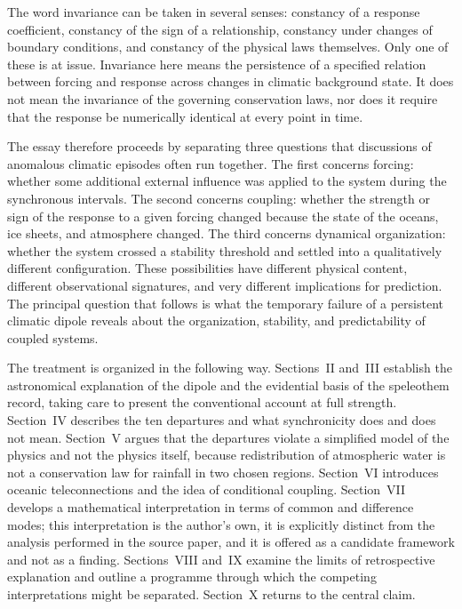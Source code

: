 \documentclass[11pt]{article}
\theoremstyle{definition}
\begin{document}
The word invariance can be taken in several senses: constancy of a response coefficient, constancy of the sign of a relationship, constancy under changes of boundary conditions, and constancy of the physical laws themselves. Only one of these is at issue. Invariance here means the persistence of a specified relation between forcing and response across changes in climatic background state. It does not mean the invariance of the governing conservation laws, nor does it require that the response be numerically identical at every point in time.

The essay therefore proceeds by separating three questions that discussions of anomalous climatic episodes often run together. The first concerns forcing: whether some additional external influence was applied to the system during the synchronous intervals. The second concerns coupling: whether the strength or sign of the response to a given forcing changed because the state of the oceans, ice sheets, and atmosphere changed. The third concerns dynamical organization: whether the system crossed a stability threshold and settled into a qualitatively different configuration. These possibilities have different physical content, different observational signatures, and very different implications for prediction. The principal question that follows is what the temporary failure of a persistent climatic dipole reveals about the organization, stability, and predictability of coupled systems.

The treatment is organized in the following way. Sections~II and~III establish the astronomical explanation of the dipole and the evidential basis of the speleothem record, taking care to present the conventional account at full strength. Section~IV describes the ten departures and what synchronicity does and does not mean. Section~V argues that the departures violate a simplified model of the physics and not the physics itself, because redistribution of atmospheric water is not a conservation law for rainfall in two chosen regions. Section~VI introduces oceanic teleconnections and the idea of conditional coupling. Section~VII develops a mathematical interpretation in terms of common and difference modes; this interpretation is the author's own, it is explicitly distinct from the analysis performed in the source paper, and it is offered as a candidate framework and not as a finding. Sections~VIII and~IX examine the limits of retrospective explanation and outline a programme through which the competing interpretations might be separated. Section~X returns to the central claim.
\end{document}
